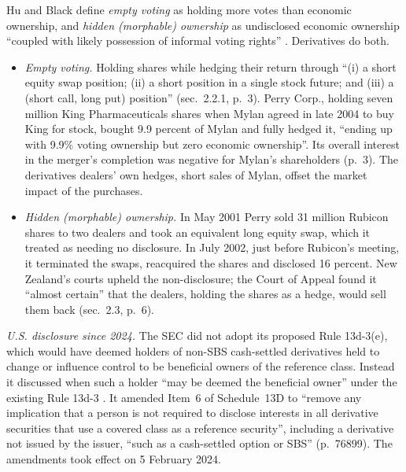 \begin{qfevidence}\label{ev:empty-voting-equity-derivatives}
 Hu and Black define \emph{empty voting} as holding more votes than economic ownership, and \emph{hidden (morphable) ownership} as undisclosed economic ownership ``coupled with likely possession of informal voting rights'' \citep[abstract and sec.~2.1, pp.~1 and~3]{cfd-hu-black-2007}. Derivatives do both.
\begin{itemize}
\item \emph{Empty voting.} Holding shares while hedging their return through ``(i) a short equity swap position; (ii) a short position in a single stock future; and (iii) a (short call, long put) position'' (sec.~2.2.1, p.~3). Perry Corp., holding seven million King Pharmaceuticals shares when Mylan agreed in late 2004 to buy King for stock, bought 9.9 percent of Mylan and fully hedged it, ``ending up with 9.9\% voting ownership but zero economic ownership''. Its overall interest in the merger's completion was negative for Mylan's shareholders (p.~3). The derivatives dealers' own hedges, short sales of Mylan, offset the market impact of the purchases.
\item \emph{Hidden (morphable) ownership.} In May 2001 Perry sold 31 million Rubicon shares to two dealers and took an equivalent long equity swap, which it treated as needing no disclosure. In July 2002, just before Rubicon's meeting, it terminated the swaps, reacquired the shares and disclosed 16 percent. New Zealand's courts upheld the non-disclosure; the Court of Appeal found it ``almost certain'' that the dealers, holding the shares as a hedge, would sell them back (sec.~2.3, p.~6).
\end{itemize}
\emph{U.S. disclosure since 2024.} The SEC did not adopt its proposed Rule 13d-3(e), which would have deemed holders of non-SBS cash-settled derivatives held to change or influence control to be beneficial owners of the reference class. Instead it discussed when such a holder ``may be deemed the beneficial owner'' under the existing Rule 13d-3 \citep[88~FR 76896, 7 November 2023, summary, p.~76898, and sec.~II.B.3, ``Commission Guidance'', pp.~76928--76929]{fr-2023-22678}. It amended Item~6 of Schedule~13D to ``remove any implication that a person is not required to disclose interests in all derivative securities that use a covered class as a reference security'', including a derivative not issued by the issuer, ``such as a cash-settled option or SBS'' (p.~76899). The amendments took effect on 5 February 2024.


\end{qfevidence}

